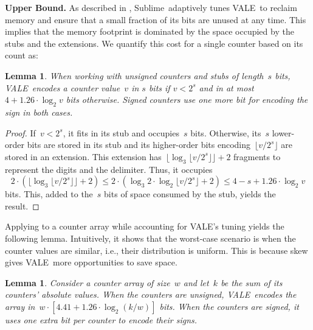 \documentclass[sigconf]{acmart}
\newtheorem{lemma}[theorem]{Lemma}
\newcommand{\sketch}{Sublime}
\newcommand{\counterencodingabbrv}{VALE}
\begin{document}
\textbf{Upper Bound.}
As described in
, \sketch\
adaptively tunes \counterencodingabbrv\ to reclaim memory and ensure that a
small fraction of its bits are unused at any time. This implies that the memory
footprint is dominated by the space occupied by the stubs and the extensions.
We quantify this cost for a single counter based on its count as:
\begin{lemma}
    \label{lemma:single_counter_space}
    When working with unsigned counters and stubs of length~$s$ bits,
    \counterencodingabbrv\ encodes a counter value~$v$ in $s$ bits if $v < 2^s$
    and in at most $4 + 1.26 \cdot \log_2 v$ bits otherwise. Signed counters
    use one more bit for encoding the sign in both cases.
\end{lemma}
\begin{proof}
    If~$v < 2^s$, it fits in its stub and occupies~$s$ bits. Otherwise, its~$s$
    lower-order bits are stored in its stub and its higher-order bits
    encoding~$\lfloor v/2^s \rfloor$ are stored in an extension. This extension
    has~$\lfloor \log_3 \lfloor v/2^s \rfloor \rfloor + 2$ fragments to
    represent the digits and the delimiter. Thus, it occupies
    $$ 2 \cdot (\lfloor \log_3 \lfloor v/2^s \rfloor \rfloor + 2) \leq 2 \cdot (\log_3 2 \cdot \log_2 \lfloor v/2^s \rfloor + 2) \leq 4 - s + 1.26 \cdot \log_2 v $$
    bits. This, added to the~$s$ bits of space consumed by the stub, yields the
    result.
\end{proof}
Applying  to a counter array while
accounting for \counterencodingabbrv's tuning yields the following lemma.
Intuitively, it shows that the worst-case scenario is when the counter values
are similar, i.e., their distribution is uniform. This is because skew gives
\counterencodingabbrv\ more opportunities to save space.
\begin{lemma}
    \label{thm:counter_array_per_counter_space}
    Consider a counter array of size~$w$ and let~$k$ be the sum of its
    counters' absolute values. When the counters are unsigned,
    \counterencodingabbrv\ encodes the array in~$w \cdot \left[ 4.41 + 1.26
    \cdot \log_2 (k/w) \right]$ bits. When the counters are signed, it uses one
    extra bit per counter to encode their signs.
\end{lemma}
\end{document}
